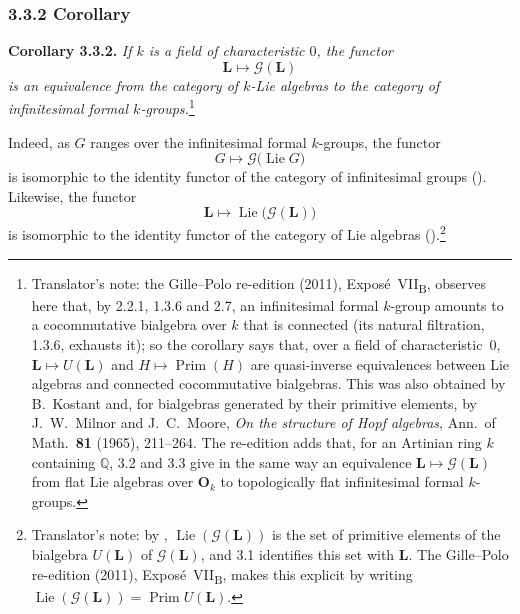
\subsubsection*{3.3.2 Corollary}
\label{sga3:VIIB:3.3.2}

\noindent\textbf{Corollary 3.3.2.}
{\itshape If \(k\) is a field of characteristic \(0\), the
functor
\[
  \mathbf L\longmapsto\mathscr G(\mathbf L)
\]
is an equivalence from the category of \(k\)-Lie algebras to the
category of infinitesimal formal \(k\)-groups.}\footnote{Translator's note: the Gille--Polo re-edition (2011),
Expos\'e~VII\textsubscript{B}, observes here that, by 2.2.1, 1.3.6 and 2.7, an infinitesimal formal \(k\)-group
amounts to a cocommutative bialgebra over \(k\) that is connected (its natural filtration, 1.3.6, exhausts
it); so the corollary says that, over a field of characteristic~\(0\), \(\mathbf L\mapsto U(\mathbf L)\) and
\(H\mapsto\operatorname{Prim}(H)\) are quasi-inverse equivalences between Lie algebras and connected
cocommutative bialgebras. This was also obtained by B.~Kostant and, for bialgebras generated by their
primitive elements, by J.~W.~Milnor and J.~C.~Moore, \emph{On the structure of Hopf algebras}, Ann.\ of
Math.\ \textbf{81} (1965), 211--264. The re-edition adds that, for an Artinian ring \(k\) containing
\(\mathbb Q\), 3.2 and 3.3 give in the same way an equivalence \(\mathbf L\mapsto\mathscr G(\mathbf L)\)
from flat Lie algebras over \(\mathbf O_k\) to topologically flat infinitesimal formal \(k\)-groups.}

Indeed, as \(G\) ranges over the infinitesimal formal
\(k\)-groups, the functor
\[
  G\longmapsto\mathscr G\bigl(\operatorname{Lie}G\bigr)
\]
is isomorphic to the identity functor of the category of infinitesimal
groups \textup{()}. Likewise, the functor
\[
  \mathbf L
  \longmapsto
  \operatorname{Lie}\bigl(\mathscr G(\mathbf L)\bigr)
\]
is isomorphic to the identity functor of the category of Lie algebras
\textup{()}.\footnote{Translator's note: by
, \(\operatorname{Lie}(\mathscr G(\mathbf L))\) is the set of primitive elements
of the bialgebra \(U(\mathbf L)\) of \(\mathscr G(\mathbf L)\), and 3.1 identifies this set with \(\mathbf L\).
The Gille--Polo re-edition (2011), Expos\'e~VII\textsubscript{B}, makes this explicit by writing
\(\operatorname{Lie}(\mathscr G(\mathbf L))=\operatorname{Prim}U(\mathbf L)\).}
